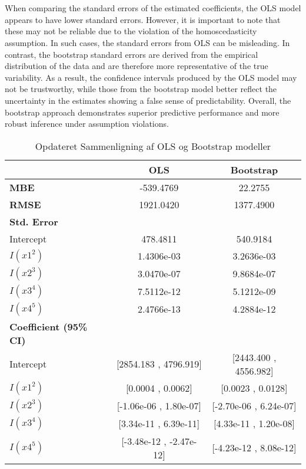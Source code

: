 \\\\
When comparing the standard errors of the estimated coefficients, the OLS model appears to have lower standard errors. However, it is important to note that these may not be reliable due to the violation of the homoscedasticity assumption. In such cases, the standard errors from OLS can be misleading. In contrast, the bootstrap standard errors are derived from the empirical distribution of the data and are therefore more representative of the true variability. As a result, the confidence intervals produced by the OLS model may not be trustworthy, while those from the bootstrap model better reflect the uncertainty in the estimates showing a false sense of predictability. Overall, the bootstrap approach demonstrates superior predictive performance and more robust inference under assumption violations.
\\



\begin{table}
	\centering
	\caption{Opdateret Sammenligning af OLS og Bootstrap modeller}
	\begin{tabular}{lcc}
		\hline
		& \textbf{OLS} & \textbf{Bootstrap} \\
		\hline
		\textbf{MBE} & -539.4769 & 22.2755 \\
		\textbf{RMSE} & 1921.0420 & 1377.4900 \\
		\hline
		\textbf{Std. Error} \\
		\hline
		Intercept & 478.4811 & 540.9184 \\
		$I(x1^2)$ & 1.4306e-03 & 3.2636e-03 \\
		$I(x2^3)$ & 3.0470e-07 & 9.8684e-07 \\
		$I(x3^4)$ & 7.5112e-12 & 5.1212e-09 \\
		$I(x4^5)$ & 2.4766e-13 & 4.2884e-12 \\
		\hline
		\textbf{Coefficient (95\% CI)} \\
		\hline
		Intercept & [2854.183 , 4796.919] & [2443.400 , 4556.982] \\
		$I(x1^2)$ & [0.0004 , 0.0062] & [0.0023 , 0.0128] \\
		$I(x2^3)$ & [-1.06e-06 , 1.80e-07] & [-2.70e-06 , 6.24e-07] \\
		$I(x3^4)$ & [3.34e-11 , 6.39e-11] & [4.33e-11 , 1.20e-08] \\
		$I(x4^5)$ & [-3.48e-12 , -2.47e-12] & [-4.23e-12 , 8.08e-12] \\
		\hline
	\end{tabular}
\end{table}